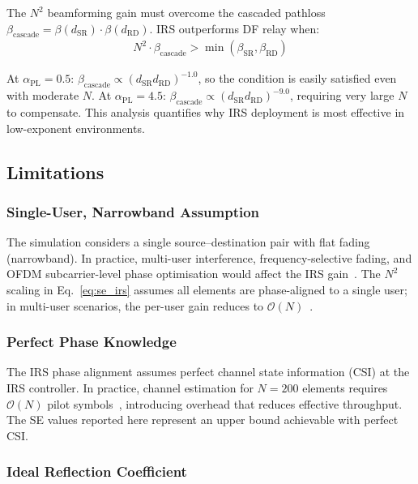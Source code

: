 \documentclass[journal]{IEEEtran} %
\begin{document}
The $N^2$ beamforming gain must overcome the cascaded pathloss $\beta_{\mathrm{cascade}} = \beta(d_{\mathrm{SR}}) \cdot \beta(d_{\mathrm{RD}})$. IRS outperforms DF relay when:
\begin{align}
    N^2 \cdot \beta_{\mathrm{cascade}} > \min(\beta_{\mathrm{SR}}, \beta_{\mathrm{RD}})
    \label{eq:irs_vs_df_condition}
\end{align}

At $\alpha_{\mathrm{PL}} = 0.5$: $\beta_{\mathrm{cascade}} \propto (d_{\mathrm{SR}} d_{\mathrm{RD}})^{-1.0}$, so the condition is easily satisfied even with moderate $N$. At $\alpha_{\mathrm{PL}} = 4.5$: $\beta_{\mathrm{cascade}} \propto (d_{\mathrm{SR}} d_{\mathrm{RD}})^{-9.0}$, requiring very large $N$ to compensate. This analysis quantifies why IRS deployment is most effective in low-exponent environments.

\subsection{Limitations}

\subsubsection{Single-User, Narrowband Assumption}

The simulation considers a single source--destination pair with flat fading (narrowband). In practice, multi-user interference, frequency-selective fading, and OFDM subcarrier-level phase optimisation would affect the IRS gain~\cite{zheng2020irs_ofdm}. The $N^2$ scaling in Eq.~\eqref{eq:se_irs} assumes all elements are phase-aligned to a single user; in multi-user scenarios, the per-user gain reduces to $\mathcal{O}(N)$~\cite{wu2020irs_tutorial}.

\subsubsection{Perfect Phase Knowledge}

The IRS phase alignment assumes perfect channel state information (CSI) at the IRS controller. In practice, channel estimation for $N = 200$ elements requires $\mathcal{O}(N)$ pilot symbols~\cite{jensen2020irs_estimation}, introducing overhead that reduces effective throughput. The SE values reported here represent an upper bound achievable with perfect CSI.

\subsubsection{Ideal Reflection Coefficient}
\end{document}
